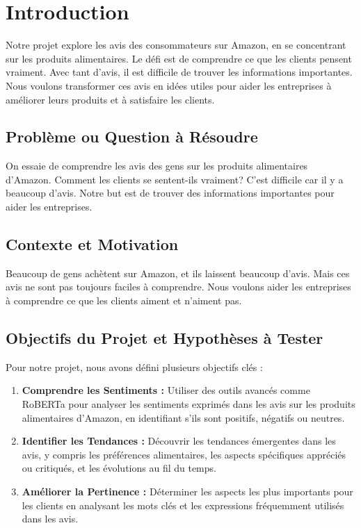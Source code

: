 
\section{Introduction} 

Notre projet explore les avis des consommateurs sur Amazon, en se concentrant sur les produits alimentaires. Le défi est de comprendre ce que les clients pensent vraiment. Avec tant d'avis, il est difficile de trouver les informations importantes. Nous voulons transformer ces avis en idées utiles pour aider les entreprises à améliorer leurs produits et à satisfaire les clients.


\subsection{Problème ou Question à Résoudre}
On essaie de comprendre les avis des gens sur les produits alimentaires d'Amazon. Comment les clients se sentent-ils vraiment? C'est difficile car il y a beaucoup d'avis. Notre but est de trouver des informations importantes pour aider les entreprises.

\subsection{Contexte et Motivation}
Beaucoup de gens achètent sur Amazon, et ils laissent beaucoup d'avis. Mais ces avis ne sont pas toujours faciles à comprendre. Nous voulons aider les entreprises à comprendre ce que les clients aiment et n'aiment pas.

\subsection{Objectifs du Projet et Hypothèses à Tester}

Pour notre projet, nous avons défini plusieurs objectifs clés :

\begin{enumerate}
    \item \textbf{Comprendre les Sentiments :} Utiliser des outils avancés comme RoBERTa pour analyser les sentiments exprimés dans les avis sur les produits alimentaires d'Amazon, en identifiant s'ils sont positifs, négatifs ou neutres.
    
    \item \textbf{Identifier les Tendances :} Découvrir les tendances émergentes dans les avis, y compris les préférences alimentaires, les aspects spécifiques appréciés ou critiqués, et les évolutions au fil du temps.
    
    \item \textbf{Améliorer la Pertinence :} Déterminer les aspects les plus importants pour les clients en analysant les mots clés et les expressions fréquemment utilisés dans les avis.
\end{enumerate}

